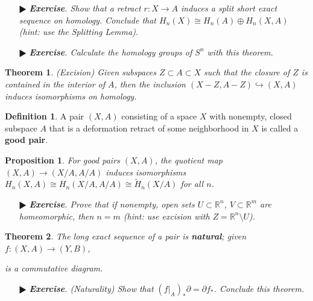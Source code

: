 \documentclass[11pt]{amsart}
\newtheorem*{theorem*}{Theorem}
\newtheorem*{proposition*}{Proposition}
\theoremstyle{definition}
\newtheorem*{definition*}{Definition}
\renewcommand\tilde{\widetilde}
\renewcommand\:{\colon}
\newcommand{\R}{\mathds{R}}
\newcommand{\1}{\mathds{1}}
\newcommand{\exc}[1]{\vspace{-2.5pt}\begin{itemize}[leftmargin=15pt]\item[$\RHD$] \textit{\textbf{Exercise}. #1}\end{itemize}}
\begin{document}
\exc{Show that a retract $r\: X \to A$ induces a split short exact sequence on homology. Conclude that $H_n(X) \cong H_n(A) \oplus H_n(X, A)$ (hint: use the Splitting Lemma).}
\exc{Calculate the homology groups of $S^n$ with this theorem.}

\begin{theorem*}
	\textnormal{(Excision)} Given subspaces $Z \subset A \subset X$ such that the closure of $Z$ is contained in the interior of $A$, then the inclusion $(X - Z, A - Z) \hookrightarrow (X, A)$ induces isomorphisms on homology.
\end{theorem*}

\begin{definition*}
	A pair $(X, A)$ consisting of a space $X$ with nonempty, closed subspace $A$ that is a deformation retract of some neighborhood in $X$ is called a \textbf{good pair}.
\end{definition*}

\begin{proposition*}
	For good pairs $(X, A)$, the quotient map $(X, A) \to (X/A, A/A)$ induces isomorphisms $H_n(X, A) \cong H_n(X/A, A/A) \cong \tilde H_n(X/A)$ for all $n$.
\end{proposition*}

\exc{Prove that if nonempty, open sets $U \subset \R^n$, $V \subset \R^m$ are homeomorphic, then $n = m$ \textnormal{(}hint: use excision with $Z = \R^n \setminus U$\textnormal{)}.}

\begin{theorem*}
	The long exact sequence of a pair is \textbf{natural}; given $f\: (X, A) \to (Y, B)$,
	\begin{center}
	\end{center}
	is a commutative diagram.
\end{theorem*}

\exc{\textnormal{(Naturality)} Show that $(f|_A)_*\partial = \partial f_*$. Conclude this theorem.}

\vskip20pt
\end{document}
